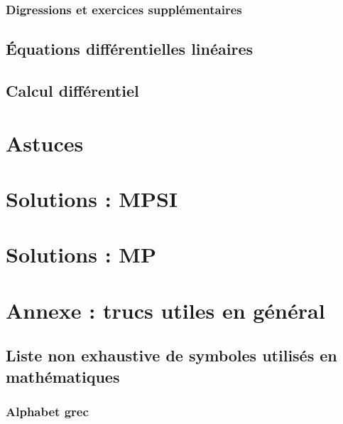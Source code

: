 \documentclass[12pt,a4paper]{book}
\theoremstyle{definition}
\theoremstyle{remark}
\begin{document}
\section{Digressions et exercices supplémentaires}

\chapter{Équations différentielles linéaires}

\chapter{Calcul différentiel}




\part{Astuces}


\part{Solutions : MPSI}


\part{Solutions : MP}

\appendix

\part{Annexe : trucs utiles en général}


\chapter{Liste non exhaustive de symboles utilisés en mathématiques}

\section{Alphabet grec}
\end{document}
